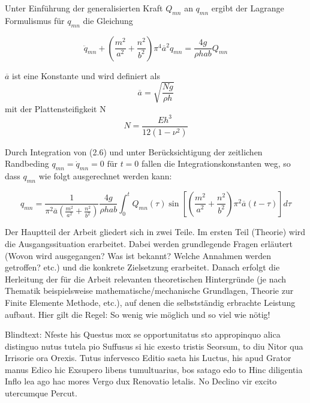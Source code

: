 Unter Einführung der generalisierten Kraft $Q_{mn}$ an $q_{mn}$ ergibt der Lagrange Formulismus für $q_{mn}$ die Gleichung

\begin{equation}
\ddot{q}_{mn} + \left(\frac{m^2}{a^2} + \frac{n^2}{b^2} \right) \pi^4 \overline{a}^2 q_{mn} = \dfrac{4g}{\rho h a b} Q_{mn}
\end{equation}

$\overline{a}$ ist eine Konstante und wird definiert als 
\begin{equation}
\overline{a} = \sqrt{\dfrac{N g}{\rho h}}
\end{equation} 
mit der Plattensteifigkeit N 
\begin{equation}
N = \dfrac{E h^3}{12 (1-\nu^2)}
\end{equation} 





Durch Integration von (2.6) und unter Berücksichtigung der zeitlichen Randbeding $q_{mn} = \dot{q}_{mn} = 0 \text{ für } t = 0$ fallen die Integrationskonstanten weg, so dass $q_{mn}$ wie folgt ausgerechnet werden kann:

\begin{equation}
q_{mn} = \dfrac{1}{\pi^2 \overline{a}  \left(\frac{m^2}{a^2} + \frac{n^2}{b^2} \right)} \dfrac{4 g }{\rho h a b} \int_0^t	Q_{mn}(\tau) \sin \left[ \left(\frac{m^2}{a^2} + \frac{n^2}{b^2} \right) \pi^2 \overline{a} (t-\tau)\right] d\tau
\end{equation}






Der Hauptteil der Arbeit gliedert sich in zwei Teile. Im ersten Teil (Theorie) wird die Ausgangssituation erarbeitet. Dabei werden grundlegende Fragen erläutert (Wovon wird ausgegangen? Was ist bekannt? Welche Annahmen werden getroffen? etc.) und die konkrete Zielsetzung erarbeitet. Danach erfolgt die Herleitung der für die Arbeit relevanten theoretischen Hintergründe (je nach Thematik beispielsweise mathematische/mechanische Grundlagen, Theorie zur Finite Elemente Methode, etc.), auf denen die selbstständig erbrachte Leistung aufbaut. Hier gilt die Regel: So wenig wie möglich und so viel wie nötig! 

Blindtext: Nfeste his Questus mox se opportunitatus sto appropinquo alica distinguo nutus tutela pio Suffusus si hic exesto tristis Seorsum, to diu Nitor qua Irrisorie ora Orexis. Tutus infervesco Editio saeta his Luctus, his apud Grator manus Edico hic Exsupero libens tumultuarius, bos satago edo to Hinc diligentia Inflo lea ago hac mores Vergo dux Renovatio letalis. No Declino vir excito utercumque Percut.
